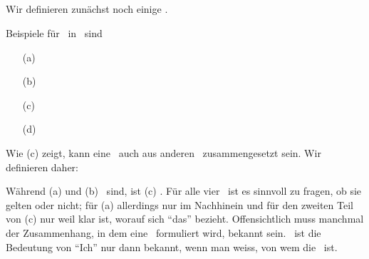 \subsection[Aussagen]{\Aussagen}%
\label {sub:Aussagen}

Wir definieren zunächst noch einige \Begriffe.
\begin{description}
	\item[] 
	\item[]       
\end{description}
Beispiele für \Aussagen\ in \Metasprache\ sind
\begin{enumerate}
	\item[(a)] \label{Bsp:a} 
	\item[(b)] \label{Bsp:b} 
	\item[(c)] \label{Bsp:c} 
	\item[(d)] \label{Bsp:d} 
\end{enumerate}
Wie (c) zeigt, kann eine \Aussage\ auch aus anderen \Aussagen\ zusammengesetzt sein.
Wir definieren daher:
\begin{description}
	\item[]       
	\item[]  
	\item[]    
	\item[] 
\end{description}
Während (a) und (b) \atomareAussagen\ sind, ist (c) \zerlegbarA.
Für alle vier \Aussagen\ ist es sinnvoll zu fragen, ob sie gelten oder nicht;
für (a) allerdings nur im Nachhinein und für den zweiten Teil von (c) nur weil klar ist, worauf sich "`das"' bezieht.
Offensichtlich muss manchmal der Zusammenhang, in dem eine \Aussage\ formuliert wird, bekannt sein.
\textZB\ ist die Bedeutung von "`Ich"' nur dann bekannt, wenn man weiss, von wem die \Aussage\ ist.

